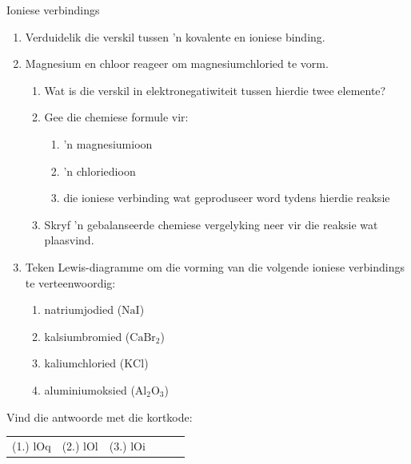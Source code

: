             \begin{exercises}{Ioniese verbindings}
            \nopagebreak
        \label{m38684*id142562}\begin{enumerate}[noitemsep, label=\textbf{\arabic*}. ] 
            \label{m38684*uid57}\item Verduidelik die verskil tussen 'n kovalente en ioniese binding.\newline
\label{m38684*uid58}\item Magnesium en chloor reageer om magnesiumchloried te vorm.
\label{m38684*id142602}\begin{enumerate}[noitemsep, label=\textbf{\alph*}. ] 
            \label{m38684*uid59}\item Wat is die verskil in elektronegatiwiteit tussen hierdie twee elemente?
\label{m38684*uid60}\item Gee die chemiese formule vir:
\label{m38684*id142630}\begin{enumerate}[noitemsep, label=\textbf{\roman*}. ] 
            \label{m38684*uid61}\item 'n magnesiumioon
\label{m38684*uid62}\item 'n chloriedioon
\label{m38684*uid63}\item die ioniese verbinding wat geproduseer word tydens hierdie reaksie
\end{enumerate}
        \label{m38684*uid64}\item Skryf 'n gebalanseerde chemiese vergelyking neer vir die reaksie wat plaasvind.
\end{enumerate}
        \label{m38684*uid65}\item Teken Lewis-diagramme om die vorming van die volgende ioniese verbindings te verteenwoordig:
\label{m38684*id142697}\begin{enumerate}[noitemsep, label=\textbf{\alph*}. ] 
            \label{m38684*uid66}\item natriumjodied  ($\text{NaI}$)
\label{m38684*uid67}\item kalsiumbromied ($\text{CaBr}{}_{2}$)
\label{m38684*uid68}\item kaliumchloried ($\text{KCl}$)
\item aluminiumoksied ($\text{Al}_{2}\text{O}_{3}$)
\end{enumerate}
        \end{enumerate}
      \label{m38684*uid69}
\par {} Vind die antwoorde met die kortkode:
 \par \begin{tabular}[h]{cccccc}
 (1.) lOq  &  (2.) lOl  &  (3.) lOi  & \end{tabular}
\end{exercises}

